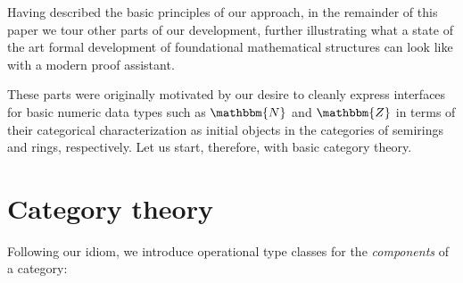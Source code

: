 \documentclass[a4paper,10pt,runningheads]{llncs}
\newcommand{\N}{\ensuremath{\mathbbm{N}}}
\newcommand{\Z}{\ensuremath{\mathbbm{Z}}}
\begin{document}
% 
% 

Having described the basic principles of our approach, in the remainder of this paper we tour other parts of our development, further illustrating what a state of the art formal development of foundational mathematical structures can look like with a modern proof assistant.

These parts were originally motivated by our desire to cleanly express interfaces for basic numeric data types such as $\N$ and $\Z$ in terms of their categorical characterization as initial objects in the categories of semirings and rings, respectively. Let us start, therefore, with basic category theory.

\section{Category theory}\label{cat}

Following our idiom, we introduce operational type classes for the \emph{components} of a category:
\end{document}
